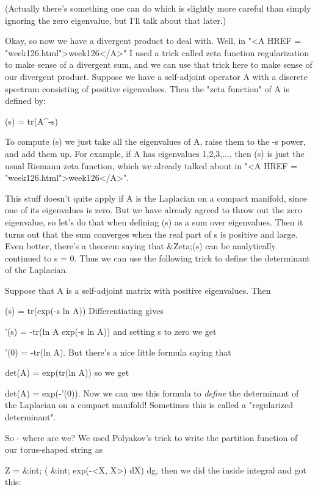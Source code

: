 (Actually there's something one can do which is slightly more careful
than simply ignoring the zero eigenvalue, but I'll talk about that later.)

Okay, so now we have a divergent product to deal with.  Well, in
"<A HREF = "week126.html">week126</A>" I used a trick called
zeta function regularization to make sense of a divergent sum, and we
can use that trick here to make sense of our divergent product.  Suppose
we have a self-adjoint operator A with a discrete spectrum consisting of
positive eigenvalues.  Then the "zeta function" of A is
defined by:

                      \zeta (s) = tr(A^{-s})

To compute \zeta (s) we just take all the eigenvalues of A, raise them to
the -s power, and add them up.   For example, if A has eigenvalues
1,2,3,..., then \zeta (s) is just the usual Riemann zeta function, which
we already talked about in "<A HREF = "week126.html">week126</A>".

This stuff doesn't quite apply if A is the Laplacian on a compact
manifold, since one of its eigenvalues is zero.  But we have already
agreed to throw out the zero eigenvalue, so let's do that when defining
\zeta (s) as a sum over eigenvalues.  Then it turns out that the sum
converges when the real part of s is positive and large.  Even better,
there's a theorem saying that &Zeta;(s) can be analytically continued to 
s = 0.  Thus we can use the following trick to define the determinant of
the Laplacian.

Suppose that A is a self-adjoint matrix with positive eigenvalues.  Then

                    \zeta (s) = tr(exp(-s ln A))
Differentiating gives

                    \zeta '(s) = -tr(ln A exp(-s ln A))
and setting s to zero we get

                    \zeta '(0) = -tr(ln A).
But there's a nice little formula saying that

                    det(A) = exp(tr(ln A))
so we get

                    det(A) = exp(-\zeta '(0)).
Now we can use this formula to \emph{define} the determinant of the Laplacian
on a compact manifold!  Sometimes this is called a "regularized 
determinant".  

So - where are we?   We used Polyakov's trick to write the partition
function of our torus-shaped string as

            Z = &int; ( &int; exp(-<X, \Delta X>) dX) dg, 
then we did the inside integral and got this:

